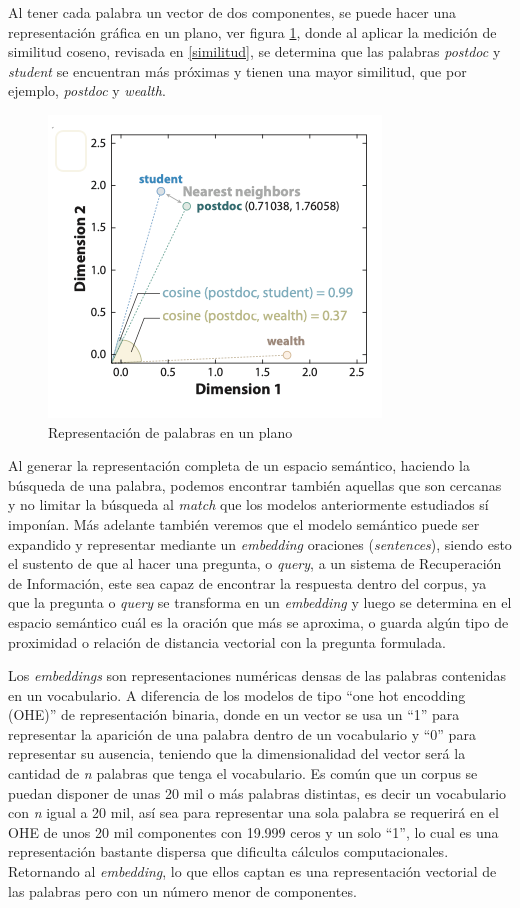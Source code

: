\documentclass[
  12pt,
  openany]{book}
\begin{document}
Al tener cada palabra un vector de dos componentes, se puede hacer una representación gráfica en un plano, ver figura \ref{fig:embeddingimg}, donde al aplicar la medición de similitud coseno, revisada en \ref{similitud}, se determina que las palabras \emph{postdoc} y \emph{student} se encuentran más próximas y tienen una mayor similitud, que por ejemplo, \emph{postdoc} y \emph{wealth}.

\begin{figure}

{\centering \includegraphics[width=0.55\linewidth]{images/03-marco-teorico/word_vec} 

}

\caption{Representación de palabras en un plano}\label{fig:embeddingimg}
\end{figure}

Al generar la representación completa de un espacio semántico, haciendo la búsqueda de una palabra, podemos encontrar también aquellas que son cercanas y no limitar la búsqueda al \emph{match} que los modelos anteriormente estudiados sí imponían. Más adelante también veremos que el modelo semántico puede ser expandido y representar mediante un \emph{embedding} oraciones (\emph{sentences}), siendo esto el sustento de que al hacer una pregunta, o \emph{query}, a un sistema de Recuperación de Información, este sea capaz de encontrar la respuesta dentro del corpus, ya que la pregunta o \emph{query} se transforma en un \emph{embedding} y luego se determina en el espacio semántico cuál es la oración que más se aproxima, o guarda algún tipo de proximidad o relación de distancia vectorial con la pregunta formulada.~

Los \emph{embeddings} son representaciones numéricas densas de las palabras contenidas en un vocabulario. A diferencia de los modelos de tipo ``one hot encodding (OHE)'' de representación binaria, donde en un vector se usa un ``1'' para representar la aparición de una palabra dentro de un vocabulario y ``0'' para representar su ausencia, teniendo que la dimensionalidad del vector será la cantidad de \emph{n} palabras que tenga el vocabulario. Es común que un corpus se puedan disponer de unas 20 mil o más palabras distintas, es decir un vocabulario con \emph{n} igual a 20 mil, así sea para representar una sola palabra se requerirá en el OHE de unos 20 mil componentes con 19.999 ceros y un solo ``1'', lo cual es una representación bastante dispersa que dificulta cálculos computacionales. Retornando al \emph{embedding}, lo que ellos captan es una representación vectorial de las palabras pero con un número menor de componentes.
\end{document}

